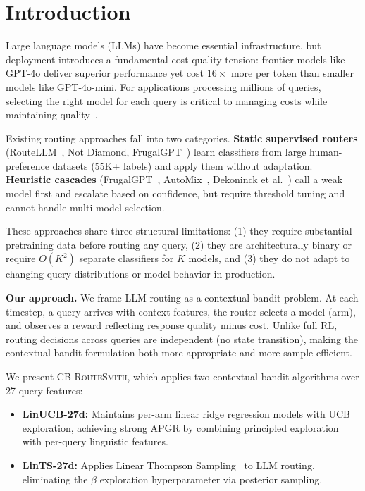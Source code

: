 \documentclass[11pt]{article}
\newcommand{\cbroutesmith}{\textsc{CB-RouteSmith}}
\begin{document}
\section{Introduction}
\label{sec:intro}

Large language models (LLMs) have become essential infrastructure, but deployment introduces a fundamental cost-quality tension: frontier models like GPT-4o deliver superior performance yet cost $16\times$ more per token than smaller models like GPT-4o-mini. For applications processing millions of queries, selecting the right model for each query is critical to managing costs while maintaining quality~\cite{ong2024routellm, chen2023frugalgpt, shnitzer2023large}.

Existing routing approaches fall into two categories. \textbf{Static supervised routers} (RouteLLM~\cite{ong2024routellm}, Not Diamond, FrugalGPT~\cite{chen2023frugalgpt}) learn classifiers from large human-preference datasets (55K+ labels) and apply them without adaptation. \textbf{Heuristic cascades} (FrugalGPT~\cite{chen2023frugalgpt}, AutoMix~\cite{aggarwal2024automix}, Dekoninck et al.\ \cite{dekoninck2025unified}) call a weak model first and escalate based on confidence, but require threshold tuning and cannot handle multi-model selection.

These approaches share three structural limitations: (1) they require substantial pretraining data before routing any query, (2) they are architecturally binary or require $O(K^2)$ separate classifiers for $K$ models, and (3) they do not adapt to changing query distributions or model behavior in production.

\textbf{Our approach.} We frame LLM routing as a contextual bandit problem. At each timestep, a query arrives with context features, the router selects a model (arm), and observes a reward reflecting response quality minus cost. Unlike full RL, routing decisions across queries are independent (no state transition), making the contextual bandit formulation both more appropriate and more sample-efficient.

We present \cbroutesmith{}, which applies two contextual bandit algorithms over 27 query features:
\begin{itemize}
    \item \textbf{LinUCB-27d:} Maintains per-arm linear ridge regression models with UCB exploration, achieving strong APGR by combining principled exploration with per-query linguistic features.
    \item \textbf{LinTS-27d:} Applies Linear Thompson Sampling~\cite{abeille2017linear} to LLM routing, eliminating the $\beta$ exploration hyperparameter via posterior sampling.
\end{itemize}
\end{document}
